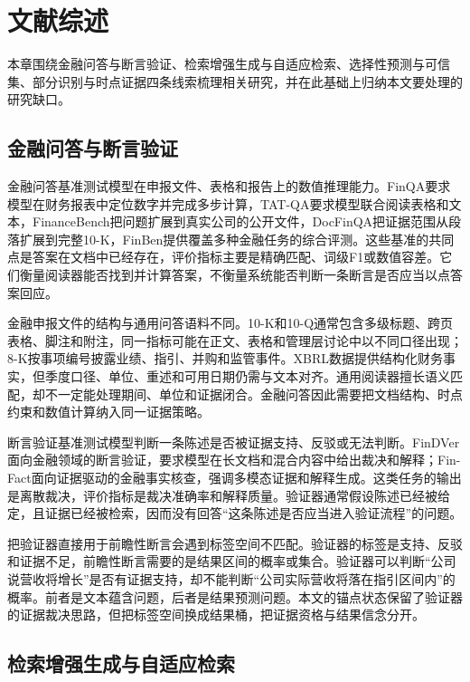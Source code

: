 \chapter{文献综述}
\label{ch:related}

本章围绕金融问答与断言验证、检索增强生成与自适应检索、选择性预测与可信集、部分识别与时点证据四条线索梳理相关研究，并在此基础上归纳本文要处理的研究缺口。

\section{金融问答与断言验证}

金融问答基准测试模型在申报文件、表格和报告上的数值推理能力。FinQA要求模型在财务报表中定位数字并完成多步计算\citep{chen2021finqa}，TAT-QA要求模型联合阅读表格和文本\citep{zhu2021tatqa}，FinanceBench把问题扩展到真实公司的公开文件\citep{islam2023financebench}，DocFinQA把证据范围从段落扩展到完整10-K\citep{reddy2024docfinqa}，FinBen提供覆盖多种金融任务的综合评测\citep{xie2024finben}。这些基准的共同点是答案在文档中已经存在，评价指标主要是精确匹配、词级F1或数值容差。它们衡量阅读器能否找到并计算答案，不衡量系统能否判断一条断言是否应当以点答案回应。

金融申报文件的结构与通用问答语料不同。10-K和10-Q通常包含多级标题、跨页表格、脚注和附注，同一指标可能在正文、表格和管理层讨论中以不同口径出现；8-K按事项编号披露业绩、指引、并购和监管事件。XBRL数据提供结构化财务事实，但季度口径、单位、重述和可用日期仍需与文本对齐。通用阅读器擅长语义匹配，却不一定能处理期间、单位和证据闭合。金融问答因此需要把文档结构、时点约束和数值计算纳入同一证据策略。

断言验证基准测试模型判断一条陈述是否被证据支持、反驳或无法判断。FinDVer面向金融领域的断言验证，要求模型在长文档和混合内容中给出裁决和解释\citep{zhao2024findver}；Fin-Fact面向证据驱动的金融事实核查，强调多模态证据和解释生成\citep{rangapur2025finfact}。这类任务的输出是离散裁决，评价指标是裁决准确率和解释质量。验证器通常假设陈述已经被给定，且证据已经被检索，因而没有回答“这条陈述是否应当进入验证流程”的问题。

把验证器直接用于前瞻性断言会遇到标签空间不匹配。验证器的标签是支持、反驳和证据不足，前瞻性断言需要的是结果区间的概率或集合。验证器可以判断“公司说营收将增长”是否有证据支持，却不能判断“公司实际营收将落在指引区间内”的概率。前者是文本蕴含问题，后者是结果预测问题。本文的锚点状态保留了验证器的证据裁决思路，但把标签空间换成结果桶，把证据资格与结果信念分开。

\section{检索增强生成与自适应检索}


